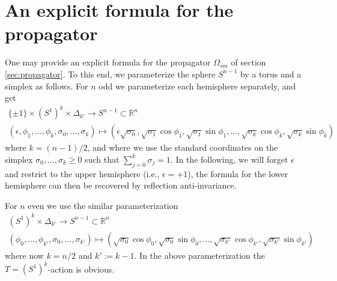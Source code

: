 \documentclass[a4paper]{amsart}
\theoremstyle{plain}
\theoremstyle{definition}
\newcommand{\R}{{\mathbb{R}}}
\begin{document}




\appendix

\section{An explicit formula for the propagator}
\label{sec:explicitpropagator}
One may provide an explicit formula for the propagator $\Omega_{sm}$ of section \ref{sec:propagator}.
To this end, we parameterize the sphere $S^{n-1}$ by a torus and a simplex as follows.
For $n$ odd we parameterize each hemisphere separately, and get
\begin{gather*}
 \{\pm 1\}\times (S^1)^k \times \Delta_{k'} \to S^{n-1}\subset \R^n \\
 (\epsilon, \phi_1,\dots,\phi_k,\sigma_0,\dots,\sigma_{k}) 
\mapsto (\epsilon \sqrt{\sigma_0}, \sqrt{\sigma_1}\cos \phi_1,\sqrt{\sigma_1}\sin\phi_1,\dots , \sqrt{\sigma_k}\cos \phi_k,\sqrt{\sigma_k}\sin\phi_k) 
\end{gather*}
where $k=(n-1)/2$, and where we use the standard coordinates on the simplex $\sigma_0,\dots,\sigma_{k}\geq 0$ such that $\sum_{j=0}^{k}\sigma_j=1$. In the following, we will forget $\epsilon$ and restrict to the upper hemisphere (i.e., $\epsilon=+1$), the formula for the lower hemisphere can then be recovered by reflection anti-invariance.

For $n$ even we use the similar parameterization
\begin{gather*}
(S^1)^k \times \Delta_{k'} \to S^{n-1}\subset \R^n \\
 (\phi_0,\dots,\phi_{k'},\sigma_0,\dots,\sigma_{k'}) 
\mapsto(\sqrt{\sigma_0}\cos \phi_0,\sqrt{\sigma_0}\sin\phi_0,\dots , \sqrt{\sigma_{k'}}\cos \phi_{k'},\sqrt{\sigma_{k'}}\sin\phi_{k'}) 
\end{gather*}
where now $k=n/2$ and $k':=k-1$.
In the above parameterization the $T=(S^1)^k$-action is obvious.
\end{document}
